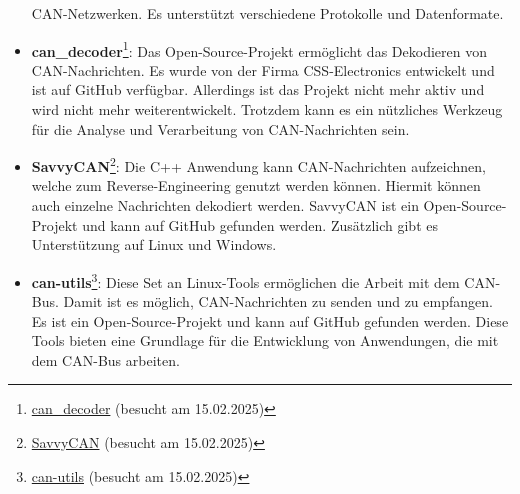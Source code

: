 \begin{itemize}
    CAN-Netzwerken. Es unterstützt verschiedene Protokolle und 
    Datenformate.
    \item \textbf{can\_decoder}\footnote{\href{https://github.com/CSS-Electronics/can_decoder}{can\_decoder} (besucht am 15.02.2025)}: 
    Das Open-Source-Projekt ermöglicht das Dekodieren von CAN-Nachrichten. Es wurde von der Firma
    CSS-Electronics entwickelt und ist auf GitHub verfügbar. Allerdings ist das Projekt nicht mehr aktiv und wird nicht mehr
    weiterentwickelt. Trotzdem kann es ein nützliches Werkzeug für die Analyse und Verarbeitung von CAN-Nachrichten 
    sein.
    \item \textbf{SavvyCAN}\footnote{\href{https://savvycan.com/index.php}{SavvyCAN} (besucht am 15.02.2025)}: 
    Die C++ Anwendung kann CAN-Nachrichten aufzeichnen, welche zum Reverse-Engineering genutzt werden können.
    Hiermit können auch einzelne Nachrichten dekodiert werden. SavvyCAN ist ein Open-Source-Projekt und kann auf GitHub gefunden werden. 
    Zusätzlich gibt es Unterstützung auf Linux und Windows.
    \item \textbf{can-utils}\footnote{\href{https://github.com/linux-can/can-utils}{can-utils} (besucht am 15.02.2025)}: 
    Diese Set an Linux-Tools ermöglichen die Arbeit mit dem CAN-Bus. Damit ist es möglich, CAN-Nachrichten 
    zu senden und zu empfangen.
    Es ist ein Open-Source-Projekt und kann auf GitHub gefunden werden. Diese Tools bieten eine Grundlage für die Entwicklung von 
    Anwendungen, die mit dem CAN-Bus arbeiten.
\end{itemize}


